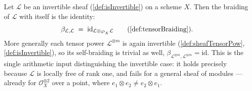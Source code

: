 \begin{lemma}

  \label{lem:braiding_eq_id_of_invertible}
  Let \(\mathcal{L}\) be an invertible sheaf (\cref{def:isInvertible}) on a scheme
  \(X\). Then the braiding of \(\mathcal{L}\) with itself is the identity:
  \[
    \beta_{\mathcal{L},\mathcal{L}} \;=\;
      \mathrm{id}_{\mathcal{L} \otimes_{\mathcal{O}_X} \mathcal{L}}
    \qquad(\cref{def:tensorBraiding}).
  \]
  More generally each tensor power \(\mathcal{L}^{\otimes m}\) is again invertible
  (\cref{def:sheafTensorPow}, \cref{def:isInvertible}), so its self-braiding is
  trivial as well, \(\beta_{\mathcal{L}^{\otimes m},\mathcal{L}^{\otimes m}} =
  \mathrm{id}\). This is the single arithmetic input distinguishing the invertible
  case: it holds precisely because \(\mathcal{L}\) is locally free of rank one, and
  fails for a general sheaf of modules --- already for
  \(\mathcal{O}_X^{\oplus 2}\) over a point, where
  \(e_1 \otimes e_2 \neq e_2 \otimes e_1\).
\end{lemma}

